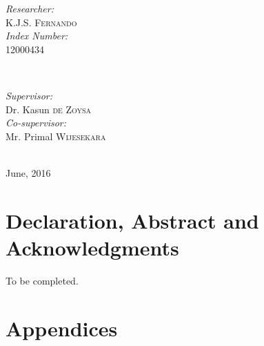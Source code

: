\begin{titlepage}
\begin{minipage}{0.4\textwidth}
\begin{flushleft} \large
\emph{Researcher:}\\
K.J.S. \textsc{Fernando}\\ %
\emph{Index Number:}\\
12000434
\end{flushleft}
\end{minipage}
~
\begin{minipage}{0.4\textwidth}
\begin{flushright} \large
\emph{Supervisor:} \\
Dr. Kasun \textsc{de Zoysa}\\ %
\emph{Co-supervisor:} \\
Mr. Primal \textsc{Wijesekara}
\end{flushright}
\end{minipage}\\[2cm]

{\large June, 2016} %


\vfill %

\end{titlepage}

\chapter{Declaration, Abstract and Acknowledgments}
To be completed.

\tableofcontents

\mainmatter


\chapter*{Appendices}


